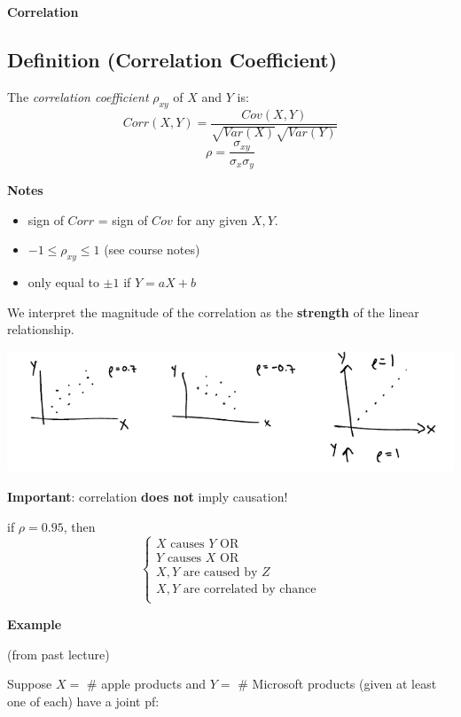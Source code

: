 \textbf{Correlation}
\begin{defbox}
    \subsection{Definition (Correlation Coefficient)}
    The \emph{correlation coefficient} $ \rho_{x y} $ of $ X $ and $ Y $ is:
    \[ Corr(X,Y)=\frac{Cov(X,Y)}{\sqrt{Var(X)}\sqrt{Var(Y)}} \]
    \[ \rho=\frac{\sigma_{x y}}{\sigma_x\sigma_y}  \]
\end{defbox}

\textbf{Notes}
\begin{itemize}
    \item sign of $Corr$ = sign of $Cov$ for any given $ X,Y $.
    \item $ -1\le\rho_{x y}\le 1 $ (see course notes)
    \item only equal to $ \pm 1 $ if $ Y=aX+b $
\end{itemize}
We interpret the magnitude of the correlation as the \textbf{strength}
of the linear relationship.

\begin{center}
    \includegraphics{correlation.png}
\end{center}

\textbf{Important}: correlation \textbf{does not} imply causation!

if $ \rho=0.95 $, then
\[ \begin{cases}
        X \text{ causes } Y \text{ OR }      \\
        Y \text{ causes } X \text{ OR }      \\
        X,Y \text{ are caused by } Z         \\
        X,Y \text{ are correlated by chance} \\
    \end{cases} \]

\textbf{Example}

(from past lecture)

Suppose $ X= $ \# apple products and $ Y= $ \# Microsoft products (given at least
one of each) have a joint pf:

